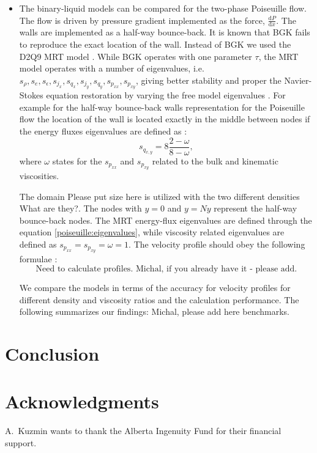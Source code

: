 \documentclass[mathpazo]{cicp}
\begin{document}
\begin{itemize}
\item The binary-liquid models can be compared for the two-phase Poiseuille
	flow. The flow is driven by pressure gradient implemented as the force,
	$\frac{\mathrm{d}P}{\mathrm{d}x}$. The walls are implemented as a half-way
	bounce-back. It is known that BGK fails to reproduce the exact location of
	the wall. Instead of BGK we used the D2Q9 MRT model
	\cite{dhumieres-first,dhumieres}. While BGK operates with one parameter
	$\tau$, the MRT model operates with a number of eigenvalues, i.e.
	$s_{\rho},s_e,s_{\epsilon},s_{j_x},s_{q_x},s_{j_y},s_{q_y},s_{p_{xx}},s_{p_{xy}}$,
	giving better stability and proper the Navier-Stokes equation restoration
	by varying the free model eigenvalues \cite{dhumieres}.  For example for
	the half-way bounce-back walls representation for the Poiseuille flow the
	location of the wall is located exactly in the middle between nodes if the
	energy fluxes eigenvalues are defined as \cite{ginzburg-multireflection}:
\begin{equation}
\label{poiseuille:eigenvalues}
	s_{q_{x,y}}=8\frac{2-\omega}{8-\omega},
\end{equation}
where $\omega$ states for the $s_{p_{xx}}$ and $s_{p_{xy}}$ related to the bulk and kinematic viscosities.

The domain {\color{red} Please put size here} is utilized with the two
different densities {\color{red} What are they?}. The nodes with $y=0$ and
$y=Ny$ represent the half-way bounce-back nodes. The MRT energy-flux
eigenvalues are defined through the equation \ref{poiseuille:eigenvalues},
while viscosity related eigenvalues are defined as
$s_{p_{xx}}=s_{p_{xy}}=\omega=1$. The velocity profile should obey the
following formulae \cite{ginzburg-discontinious}:
\begin{equation}
	\text{Need to calculate profiles. Michal, if you already have it - please add.}
\end{equation}

We compare the models in terms of the accuracy for velocity profiles for
different density and viscosity ratios and the calculation performance. The
following summarizes our findings: {\color{red} Michal, please add here
benchmarks}.

\end{itemize}
\section{Conclusion}
\section*{Acknowledgments}
A.~Kuzmin wants to thank the Alberta Ingenuity Fund for their financial support.
\end{document}
